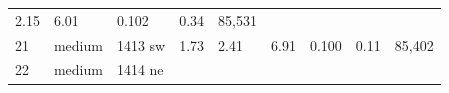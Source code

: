 \documentclass[
  10pt, ]{article}
\begin{document}
\begin{longtable}[]{@{}lllllllll@{}}
\begin{minipage}[t]{0.08\columnwidth}
2.15\strut
\end{minipage} & \begin{minipage}[t]{0.08\columnwidth}\raggedright
6.01\strut
\end{minipage} & \begin{minipage}[t]{0.08\columnwidth}\raggedright
0.102\strut
\end{minipage} & \begin{minipage}[t]{0.08\columnwidth}\raggedright
0.34\strut
\end{minipage} & \begin{minipage}[t]{0.08\columnwidth}\raggedright
85,531\strut
\end{minipage}\tabularnewline
\begin{minipage}[t]{0.08\columnwidth}\raggedright
21\strut
\end{minipage} & \begin{minipage}[t]{0.08\columnwidth}\raggedright
medium\strut
\end{minipage} & \begin{minipage}[t]{0.08\columnwidth}\raggedright
1413 sw\strut
\end{minipage} & \begin{minipage}[t]{0.08\columnwidth}\raggedright
1.73\strut
\end{minipage} & \begin{minipage}[t]{0.08\columnwidth}\raggedright
2.41\strut
\end{minipage} & \begin{minipage}[t]{0.08\columnwidth}\raggedright
6.91\strut
\end{minipage} & \begin{minipage}[t]{0.08\columnwidth}\raggedright
0.100\strut
\end{minipage} & \begin{minipage}[t]{0.08\columnwidth}\raggedright
0.11\strut
\end{minipage} & \begin{minipage}[t]{0.08\columnwidth}\raggedright
85,402\strut
\end{minipage}\tabularnewline
\begin{minipage}[t]{0.08\columnwidth}\raggedright
22\strut
\end{minipage} & \begin{minipage}[t]{0.08\columnwidth}\raggedright
medium\strut
\end{minipage} & \begin{minipage}[t]{0.08\columnwidth}\raggedright
1414 ne\strut
\end{minipage} & \begin{minipage}[t]{0.08\columnwidth}\raggedright

\end{minipage}
\end{longtable}
\end{document}

